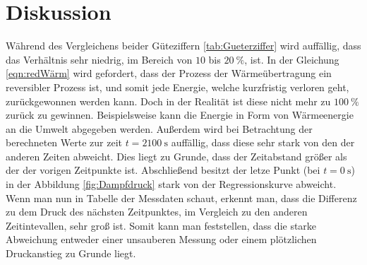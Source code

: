 \section{Diskussion}
\label{sec:Diskussion}
Während des Vergleichens beider Güteziffern \eqref{tab:Gueterziffer} wird auffällig, dass das Verhältnis sehr niedrig, im Bereich von $10$ bis $\SI{20}{\percent}$, ist.
In der Gleichung \eqref{eqn:redWärm} wird gefordert, dass der Prozess der Wärmeübertragung ein reversibler Prozess ist,
und somit jede Energie, welche kurzfristig verloren geht, zurückgewonnen werden kann. Doch in der Realität ist diese nicht mehr zu $\SI{100}{\percent}$
zurück zu gewinnen. Beispielsweise kann die Energie in Form von Wärmeenergie an die Umwelt abgegeben werden.
Außerdem wird bei Betrachtung der berechneten Werte zur zeit $t = \SI{2100}{\second}$ auffällig, dass diese sehr stark von den der anderen Zeiten abweicht. Dies liegt
zu Grunde, dass der Zeitabstand größer als der der vorigen Zeitpunkte ist. Abschließend besitzt der letze Punkt (bei $t = \SI{0}{\second}$)
in der Abbildung \eqref{fig:Dampfdruck} stark von der Regressionskurve abweicht. Wenn man nun in Tabelle der Messdaten schaut, erkennt man, dass die Differenz
zu dem Druck des nächsten Zeitpunktes, im Vergleich zu den anderen Zeitintevallen, sehr groß ist. Somit kann man feststellen, dass die starke Abweichung entweder
einer unsauberen Messung oder einem plötzlichen Druckanstieg zu Grunde liegt.
\newpage